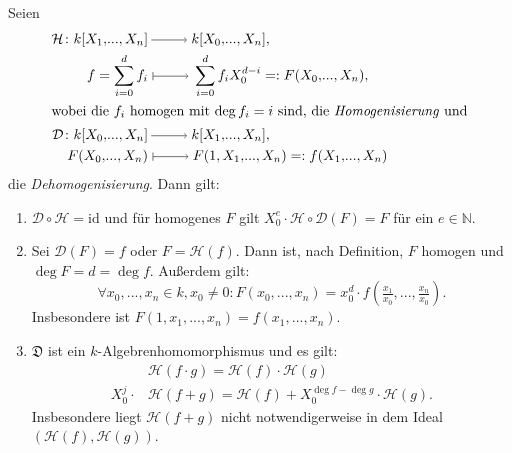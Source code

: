 \documentclass[a4paper,12pt]{scrbook}
\theoremstyle{keinenummern} %
\theoremstyle{mitnummern}
\theoremstyle{unserbeweis}
\newcommand{\D}{\mathfrak{D}}
\newcommand{\DD}{\mathcal{D}} %
\renewcommand{\H}{\mathcal{H}} %
\newcommand{\id}{\mathrm{id}}
\renewcommand{\dotsc}{\ensuremath{\!...}}
\newcommand{\set}[1]{\ensuremath{\mathbb{#1}}}
\newcommand{\N}{\set{N}}
\newcommand{\ra}{\raisebox{-1pt}{\tikz{\draw[thin,shorten >=3pt, ->] (0,0) node{\hspace*{-2pt}} -- node{} (1,0);}}\penalty1000\relax}
\renewcommand{\mapsto}{\raisebox{-1pt}{\tikz{\draw[thin,shorten >=3pt, |->] (0,0) node{\hspace*{0pt}} -- node{} (1,0);}}\penalty1000\relax}
\newcommand{\polyx}[1][n]{\ensuremath%
  [X_{1},\dotsc,X_{#1}]}
\newcommand{\ppolyx}[1][n]{\ensuremath%
  [X_{0},\dotsc,X_{#1}]}
\begin{document}
\begin{dl}\label{2.3.9} Seien
\begin{align*}\H\colon k\polyx&\ra k\ppolyx,\\
 f=\sum_{i=0}^{d}f_{i}&\mapsto\sum_{i=0}^{d}f_{i}X_{0}^{d-i}=:F(X_{0},\dotsc,X_{n}),\\
\intertext{wobei die $f_{i}$ homogen mit $\deg f_{i}=i$ sind, die \emph{Homogenisierung} und}
\DD\colon k\ppolyx&\ra k\polyx,\\
F(X_{0},\dotsc,X_{n})&\mapsto F(1,X_{1},\dotsc,X_{n})=:f(X_{1},\dotsc,X_{n})\end{align*}
die \emph{Dehomogenisierung}. Dann gilt:
\begin{enumerate}
\item{} $\DD\circ \H=\id$ und für homogenes $F$ gilt $X_{0}^{e}\cdot \H\circ \DD(F)=F$ für ein $e\in\N$.
\item{} Sei $\DD(F)=f$ oder $F=\H(f)$. Dann ist, nach Definition, $F$ homogen und $\deg F=d=\deg f$. Außerdem gilt:\vspace*{-6pt}
\[\forall x_{0},\dotsc,x_{n}\in k, x_{0}\neq 0\colon  F(x_{0},\dotsc,x_{n})=x_{0}^{d}\cdot f(\tfrac{x_{1}}{x_{0}},\dotsc,\tfrac{x_{n}}{x_{0}}).\]
Insbesondere ist $F(1,x_{1},\dotsc,x_{n}) = f(x_{1},\dotsc,x_{n})$.
\item{} $\D$ ist ein $k$-Algebrenhomomorphismus und es gilt:
\begin{align*}
&\H(f\cdot g)=\H(f)\cdot \H(g)\\
X_{0}^{j}\cdot&\H(f+g)=\H(f)+X_{0}^{\deg f-\deg g}\cdot \H(g).\end{align*}
Insbesondere liegt $\H(f+g)$ nicht notwendigerweise in dem Ideal $(\H(f),\H(g))$.
\end{enumerate}\end{dl}
%
\end{document}
